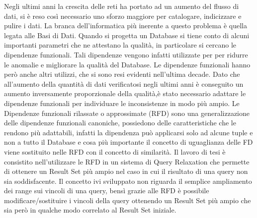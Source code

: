 Negli ultimi anni la crescita delle reti ha portato ad un aumento del flusso di dati, si è reso così necessario uno sforzo maggiore per catalogare, indicizzare e pulire i  dati. 
La branca dell’informatica più inerente a questo problema è quella legata alle Basi di Dati. 
Quando si progetta un Database si tiene conto di alcuni importanti parametri che ne attestano la qualità, in particolare si cercano le dipendenze funzionali. Tali dipendenze vengono infatti utilizzate per per ridurre le anomalie e migliorare la qualità del Database.
Le dipendenze funzionali hanno però anche altri utilizzi, che si sono resi evidenti nell’ultima decade. Dato che all’aumento della quantità di dati verificatosi negli ultimi anni è conseguito un aumento inversamente proporzionale della qualità,è stato necessario  adattare le dipendenze funzionali per individuare le inconsistenze in modo più ampio.
Le Dipendenze funzionali rilassate o approssimate (RFD) sono una generalizzazione delle dipendenze funzionali canoniche, possiedono delle caratteristiche che le rendono più adattabili, infatti la dipendenza può applicarsi solo ad alcune tuple e non a tutto il Database e cosa più importante il concetto di uguaglianza delle FD viene sostituito nelle RFD  con il concetto di similarità. 
Il lavoro di tesi è consistito nell’utilizzare le RFD in un sistema di Query Relaxation che permette di ottenere un Result Set più ampio nel caso in cui il risultato di una query non sia soddisfacente.
Il concetto ivi sviluppato non riguarda il semplice ampliamento dei range sui vincoli di una query, bensì grazie alle RFD  è possibile modificare/sostituire i vincoli della query ottenendo un Result Set più ampio che sia però in qualche modo correlato al Result Set iniziale.